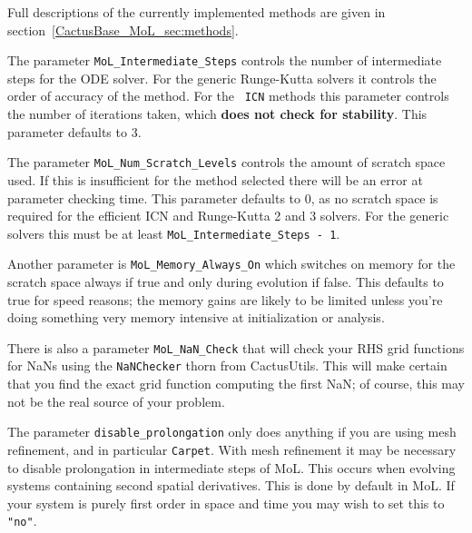 Full descriptions of the currently implemented methods are given in
section~\ref{CactusBase_MoL_sec:methods}. 

The parameter {\tt MoL\_Intermediate\_Steps} controls the number of
intermediate steps for the ODE solver. For the generic Runge-Kutta
solvers it controls the order of accuracy of the method.  For the {\tt
  ICN} methods this parameter controls the number of iterations taken,
which {\bf does not check for stability}. This parameter defaults to
3.

The parameter {\tt MoL\_Num\_Scratch\_Levels} controls the amount of
scratch space used. If this is insufficient for the method selected
there will be an error at parameter checking time. This parameter
defaults to 0, as no scratch space is required for the efficient ICN
and Runge-Kutta 2 and 3 solvers. For the generic solvers this must be
at least {\tt MoL\_Intermediate\_Steps - 1}.

Another parameter is {\tt MoL\_Memory\_Always\_On} which switches on
memory for the scratch space always if true and only during evolution
if false. This defaults to true for speed reasons; the memory gains
are likely to be limited unless you're doing something very memory
intensive at initialization or analysis.

There is also a parameter {\tt MoL\_NaN\_Check} that will check your
RHS grid functions for NaNs using the {\tt NaNChecker} thorn from
CactusUtils. This will make certain that you find the exact grid
function computing the first NaN; of course, this may not be the real
source of your problem.

The parameter {\tt disable\_prolongation} only does anything if you
are using mesh refinement, and in particular {\tt Carpet}. With mesh
refinement it may be necessary to disable prolongation in intermediate
steps of MoL. This occurs when evolving systems containing second
spatial derivatives. This is done by default in MoL. If your system is
purely first order in space and time you may wish to set this to {\tt "no"}.

